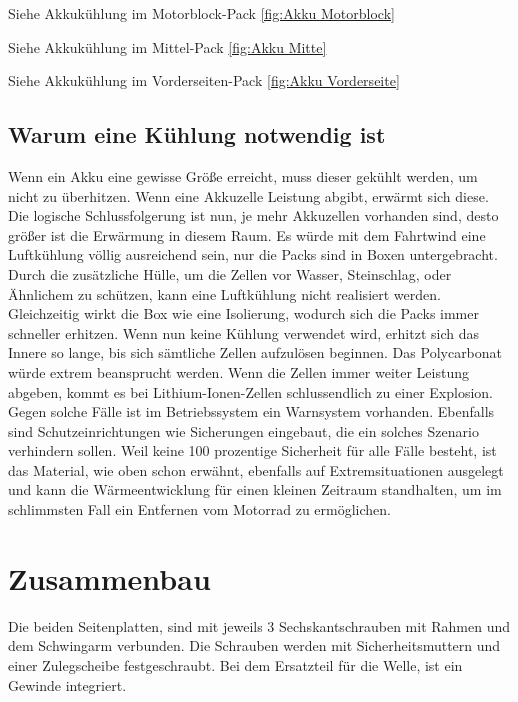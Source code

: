 Siehe Akkukühlung im Motorblock-Pack \ref{fig:Akku Motorblock}

Siehe Akkukühlung im Mittel-Pack \ref{fig:Akku Mitte}

Siehe Akkukühlung im Vorderseiten-Pack \ref{fig:Akku Vorderseite}

\subsection{Warum eine Kühlung notwendig ist}

Wenn ein Akku eine gewisse Größe erreicht, muss dieser gekühlt werden, um nicht zu überhitzen. Wenn eine Akkuzelle Leistung abgibt, erwärmt sich diese. Die logische Schlussfolgerung ist nun, je mehr Akkuzellen vorhanden sind, desto größer ist die Erwärmung in diesem Raum. Es würde mit dem Fahrtwind eine Luftkühlung völlig ausreichend sein, nur die Packs sind in Boxen untergebracht. Durch die zusätzliche Hülle, um die Zellen vor Wasser, Steinschlag, oder Ähnlichem zu schützen, kann eine Luftkühlung nicht realisiert werden. Gleichzeitig wirkt die Box wie eine Isolierung, wodurch sich die Packs immer schneller erhitzen.
Wenn nun keine Kühlung verwendet wird, erhitzt sich das Innere so lange, bis sich sämtliche Zellen aufzulösen beginnen. Das Polycarbonat würde extrem beansprucht werden. Wenn die Zellen immer weiter Leistung abgeben, kommt es bei Lithium-Ionen-Zellen schlussendlich zu einer Explosion.  
Gegen solche Fälle ist im Betriebssystem ein Warnsystem vorhanden. Ebenfalls sind Schutzeinrichtungen wie Sicherungen eingebaut, die ein solches Szenario verhindern sollen. 
Weil keine 100 prozentige Sicherheit für alle Fälle besteht, ist das Material, wie oben schon erwähnt, ebenfalls auf Extremsituationen ausgelegt und kann die Wärmeentwicklung für einen kleinen Zeitraum standhalten, um im schlimmsten Fall ein Entfernen vom Motorrad zu ermöglichen.

\newpage

\section{Zusammenbau}

Die beiden Seitenplatten, sind mit jeweils 3 Sechskantschrauben mit Rahmen und dem Schwingarm verbunden. Die Schrauben werden mit Sicherheitsmuttern und einer Zulegscheibe festgeschraubt. Bei dem Ersatzteil für die Welle, ist ein Gewinde integriert.



